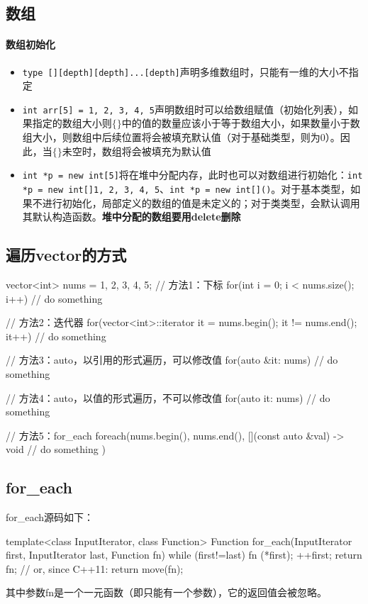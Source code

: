 \subsection{数组}
\paragraph{数组初始化}
\begin{itemize}
	\item \texttt{type [][depth][depth]...[depth]}声明多维数组时，只能有一维的大小不指定
	\item \texttt{int arr[5] = {1, 2, 3, 4, 5}}声明数组时可以给数组赋值（初始化列表），如果指定的数组大小则$\{\}$中的值的数量应该小于等于数组大小，如果数量小于数组大小，则数组中后续位置将会被填充默认值（对于基础类型，则为0）。因此，当$\{\}$未空时，数组将会被填充为默认值
	\item \texttt{int *p = new int[5]}将在堆中分配内存，此时也可以对数组进行初始化：\texttt{int *p = new int[]{1, 2, 3, 4, 5}}、\texttt{int *p = new int[]()}。对于基本类型，如果不进行初始化，局部定义的数组的值是未定义的；对于类类型，会默认调用其默认构造函数。\textbf{堆中分配的数组要用delete删除}
\end{itemize}

\subsection{遍历vector的方式}
\begin{cpp}
	vector<int> nums = {1, 2, 3, 4, 5};
	// 方法1：下标
	for(int i = 0; i < nums.size(); i++){
		// do something
	}
	
	// 方法2：迭代器
	for(vector<int>::iterator it = nums.begin(); it != nums.end(); it++){
		// do something
	}

	// 方法3：auto，以引用的形式遍历，可以修改值
	for(auto &it: nums){
		// do something 
	}

	// 方法4：auto，以值的形式遍历，不可以修改值
	for(auto it: nums){
		// do something
	}
	
	// 方法5：for_each
	foreach(nums.begin(), nums.end(),
			[](const auto &val) -> void { 
				// do something
			})
	
\end{cpp}

\subsection{for\_each}
for\_each源码如下：
\begin{cpp}
	template<class InputIterator, class Function>
	Function for_each(InputIterator first, InputIterator last, Function fn)
	{
		while (first!=last) {
			fn (*first);
			++first;
		}
		return fn;      // or, since C++11: return move(fn);
	}
\end{cpp}
其中参数fn是一个一元函数（即只能有一个参数），它的返回值会被忽略。

